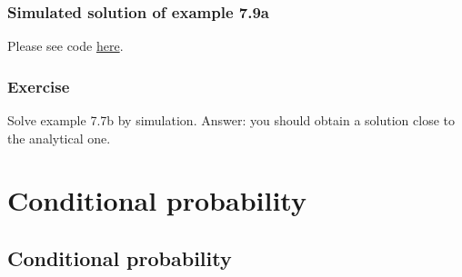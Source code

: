 \begin{frame}[fragile]
    \frametitle{Simulated solution of example 7.9a}

    Please see code \href{https://joacorapela.github.io/gcnuBridging2023/auto_examples/foundations/plot_example7_9a.html#sphx-glr-auto-examples-foundations-plot-example7-9a-py}{here}.

\end{frame}

\begin{frame}
    \frametitle{Exercise}

    Solve example 7.7b by simulation. Answer: you should obtain a solution
    close to the analytical one.

\end{frame}

\section{Conditional probability}

\subsection{Conditional probability}

